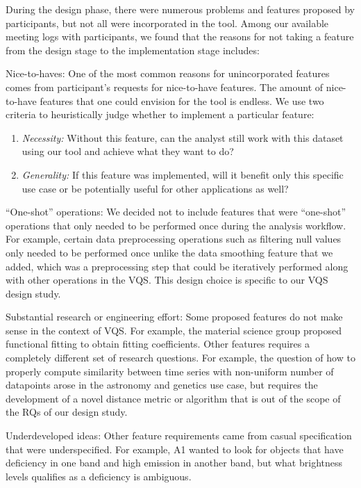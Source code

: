 {
\npar During the design phase, there were numerous problems and features proposed by participants, but not all were incorporated in the tool. Among our available meeting logs with participants, we found that the reasons for not taking a feature from the design stage to the implementation stage includes: 
\begin{denselist}
\item Nice-to-haves: One of the most common reasons for unincorporated features comes from participant's requests for nice-to-have features. The amount of nice-to-have features that one could envision for the tool is endless. We use 
two criteria to heuristically judge whether to implement a particular feature:
\begin{enumerate}[leftmargin=*]
\item \textit{Necessity:} Without this feature, can the analyst still work with this dataset using our tool and achieve what they want to do? 
\item \textit{Generality:} If this feature was implemented, will it benefit only this specific use case or be potentially useful for other applications as well?
\end{enumerate}
\item ``One-shot'' operations: We decided not to include features that were ``one-shot'' operations that only needed to be performed once during the analysis workflow. For example, certain data preprocessing operations such as filtering null values only needed to be performed once unlike the data smoothing feature that we added, which was a preprocessing step that could be iteratively performed along with other operations in the VQS. This design choice is specific to our VQS design study.
\item Substantial research or engineering effort: Some proposed features do not make sense in the context of VQS. For example, the material science group proposed functional fitting to obtain fitting coefficients. Other features requires a completely different set of research questions. For example, the question of how to properly compute similarity between time series with non-uniform number of datapoints arose in the astronomy and genetics use case, but requires the development of a novel distance metric or algorithm that is out of the scope of the RQs of our design study.
\item Underdeveloped ideas: Other feature requirements came from casual specification that were underspecified. For example, A1 wanted to look for objects that have deficiency in one band and high emission in another band, but what brightness levels qualifies as a deficiency is ambiguous.
\end{denselist}

}
